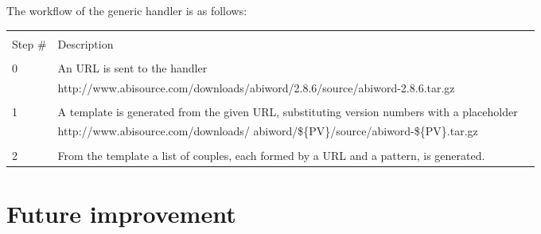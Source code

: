 The workflow of the generic handler is as follows:
\bgroup
\def\arraystretch{1.2}
\begin{table}[ht]
\centering
\begin{tabular}{l p{5cm} p{5cm}}
\hline\hline \\
Step \# & Description \\ [0.5ex] 
\hline  \\
0 & An URL is sent to the handler \\ 
& http://www.abisource.com/downloads/abiword/2.8.6/source/abiword-2.8.6.tar.gz \\

\hline  \\
1 & A template is generated from the given URL, substituting version numbers with a placeholder \\
& http://www.abisource.com/downloads/
abiword/\$\{PV\}/source/abiword-\$\{PV\}.tar.gz \\

\hline \\
2 & From the template a list of couples, each formed by a URL and a pattern, is generated.
\end{tabular}
\end{table}
\egroup

\section{Future improvement}